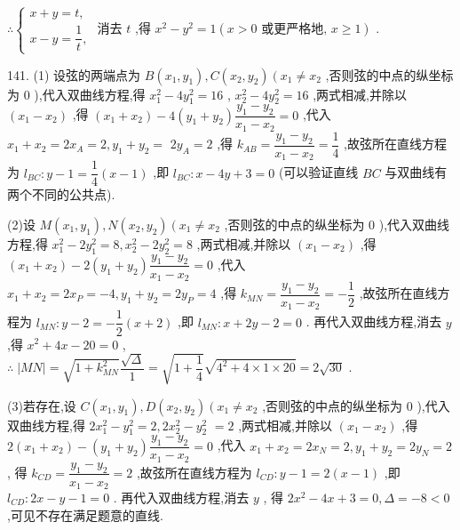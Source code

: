 $\therefore \left\{  \begin{array}{l} x + y = t, \\  x - y = \dfrac{1}{t}, \end{array}\right.$ 消去 $t$ ,得 ${x}^{2} - {y}^{2} = 1\left( {x > 0\text{ 或更严格地, }x \geq  1}\right)$ .

141. (1) 设弦的两端点为 $B\left( {{x}_{1},{y}_{1}}\right) ,C\left( {{x}_{2},{y}_{2}}\right) \left( {{x}_{1} \neq  {x}_{2}}\right.$ ,否则弦的中点的纵坐标为 0 ),代入双曲线方程,得 ${x}_{1}^{2} - 4{y}_{1}^{2} = {16}$ , ${x}_{2}^{2} - 4{y}_{2}^{2} = {16}$ ,两式相减,并除以 $\left( {{x}_{1} - {x}_{2}}\right)$ ,得 $\left( {{x}_{1} + {x}_{2}}\right)  - 4\left( {{y}_{1} + {y}_{2}}\right) \dfrac{{y}_{1} - {y}_{2}}{{x}_{1} - {x}_{2}} = 0$ ,代入 ${x}_{1} + {x}_{2} = 2{x}_{A} = 2,{y}_{1} + {y}_{2} =$  $2{y}_{A} = 2$ ,得 ${k}_{AB} = \dfrac{{y}_{1} - {y}_{2}}{{x}_{1} - {x}_{2}} = \dfrac{1}{4}$ ,故弦所在直线方程为 ${l}_{BC} : y - 1 = \dfrac{1}{4}\left( {x - 1}\right)$ ,即 ${l}_{BC} : x - {4y} + 3 = 0$ (可以验证直线 ${BC}$ 与双曲线有两个不同的公共点).

(2)设 $M\left( {{x}_{1},{y}_{1}}\right) ,N\left( {{x}_{2},{y}_{2}}\right) \left( {{x}_{1} \neq  {x}_{2}}\right.$ ,否则弦的中点的纵坐标为 0 ),代入双曲线方程,得 ${x}_{1}^{2} - 2{y}_{1}^{2} = 8,{x}_{2}^{2} - 2{y}_{2}^{2} = 8$ ,两式相减,并除以 $\left( {{x}_{1} - {x}_{2}}\right)$ ,得 $\left( {{x}_{1} + {x}_{2}}\right)  - 2\left( {{y}_{1} + {y}_{2}}\right) \dfrac{{y}_{1} - {y}_{2}}{{x}_{1} - {x}_{2}} = 0$ ,代入 ${x}_{1} + {x}_{2} = 2{x}_{P} =  - 4,{y}_{1} + {y}_{2} = 2{y}_{P} = 4$ ,得 ${k}_{MN} = \dfrac{{y}_{1} - {y}_{2}}{{x}_{1} - {x}_{2}} =  - \dfrac{1}{2}$ ,故弦所在直线方程为 ${l}_{MN} : y - 2 =  - \dfrac{1}{2}\left( {x + 2}\right)$ ,即 ${l}_{MN} : x + {2y} - 2 = 0$ . 再代入双曲线方程,消去 $y$ ,得 ${x}^{2} + {4x} - {20} = 0$ , $\therefore \;\left| {MN}\right|  = \sqrt{1 + {k}_{MN}^{2}}\dfrac{\sqrt{\Delta }}{1} = \sqrt{1 + \dfrac{1}{4}}\sqrt{{4}^{2} + 4 \times  1 \times  {20}} = 2\sqrt{30}$ .

(3)若存在,设 $C\left( {{x}_{1},{y}_{1}}\right) ,D\left( {{x}_{2},{y}_{2}}\right) \left( {{x}_{1} \neq  {x}_{2}}\right.$ ,否则弦的中点的纵坐标为 0 ),代入双曲线方程,得 $2{x}_{1}^{2} - {y}_{1}^{2} = 2,2{x}_{2}^{2} - {y}_{2}^{2}$  $= 2$ ,两式相减,并除以 $\left( {{x}_{1} - {x}_{2}}\right)$ ,得 $2\left( {{x}_{1} + {x}_{2}}\right)  - \left( {{y}_{1} + {y}_{2}}\right) \dfrac{{y}_{1} - {y}_{2}}{{x}_{1} - {x}_{2}} = 0$ ,代入 ${x}_{1} + {x}_{2} = 2{x}_{N} = 2,{y}_{1} + {y}_{2} = 2{y}_{N} = 2$ , 得 ${k}_{CD} = \dfrac{{y}_{1} - {y}_{2}}{{x}_{1} - {x}_{2}} = 2$ ,故弦所在直线方程为 ${l}_{CD} : y - 1 = 2\left( {x - 1}\right)$ ,即 ${l}_{CD} : {2x} - y - 1 = 0$ . 再代入双曲线方程,消去 $y$ , 得 $2{x}^{2} - {4x} + 3 = 0,\Delta  =  - 8 < 0$ ,可见不存在满足题意的直线.

